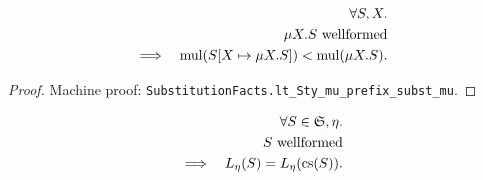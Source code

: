 \documentclass{llncs}
\renewcommand*{\S}{\mathfrak{S}}
\newcommand*{\cs}{\mathrm{cs}}
\newcommand*{\mul}{\mathrm{mul}}
\newcommand*{\wf}[1]{\text{$#1$ {\normalfont \rmfamily wellformed}}}
\renewcommand*{\|}{\;|\;}
\newcommand*{\machproofc}[1]{Machine proof: \code{#1}.}
\newcommand*{\code}[1]{\texttt{#1}}
\begin{document}
\begin{lemma}
  \label{lemma:mu_expansion_mul}
  \begin{eqnarray*}
    &&         \forall S, X. \\
    &&         \wf{\mu X.S} \\
    &\implies& \mul(S[X \mapsto \mu X.S]) < \mul(\mu X.S).
  \end{eqnarray*}
\end{lemma}

\begin{proof}
  \machproofc{SubstitutionFacts.lt\_Sty\_mu\_prefix\_subst\_mu}
\end{proof}


\begin{lemma}
  \label{lemma:cs_preserves_trace_language}
  \begin{eqnarray*}
    && \forall S \in \S, \eta. \\
    && \wf{S} \\
    &\implies& L_\eta(S) = L_\eta(\cs(S)).
  \end{eqnarray*}
\end{lemma}
\end{document}
